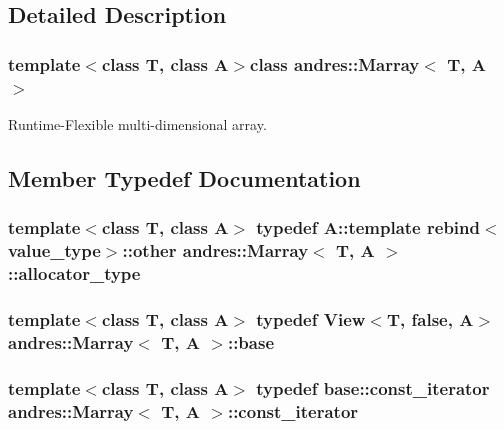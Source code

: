 \subsection{Detailed Description}
\subsubsection*{template$<$class T, class A$>$class andres\+::\+Marray$<$ T, A $>$}

Runtime-\/\+Flexible multi-\/dimensional array. 

\subsection{Member Typedef Documentation}
\hypertarget{classandres_1_1Marray_a1e38873cb38bd8568be81bfb804deefd}{}
\subsubsection[{allocator\+\_\+type}]{\setlength{\rightskip}{0pt plus 5cm}template$<$class T, class A$>$ typedef A\+::template rebind$<${\bf value\+\_\+type}$>$\+::other {\bf andres\+::\+Marray}$<$ T, A $>$\+::{\bf allocator\+\_\+type}}\label{classandres_1_1Marray_a1e38873cb38bd8568be81bfb804deefd}
\hypertarget{classandres_1_1Marray_ad954a5c638124bd4cbfdedf8fed54f0c}{}
\subsubsection[{base}]{\setlength{\rightskip}{0pt plus 5cm}template$<$class T, class A$>$ typedef {\bf View}$<$T, false, A$>$ {\bf andres\+::\+Marray}$<$ T, A $>$\+::{\bf base}}\label{classandres_1_1Marray_ad954a5c638124bd4cbfdedf8fed54f0c}
\hypertarget{classandres_1_1Marray_a0b3be7ebc2bd3a247b59a8ed7be24102}{}
\subsubsection[{const\+\_\+iterator}]{\setlength{\rightskip}{0pt plus 5cm}template$<$class T, class A$>$ typedef {\bf base\+::const\+\_\+iterator} {\bf andres\+::\+Marray}$<$ T, A $>$\+::{\bf const\+\_\+iterator}}\label{classandres_1_1Marray_a0b3be7ebc2bd3a247b59a8ed7be24102}
\hypertarget{classandres_1_1Marray_a6e9d79616cdeed14221d96431ab5f678}{}
